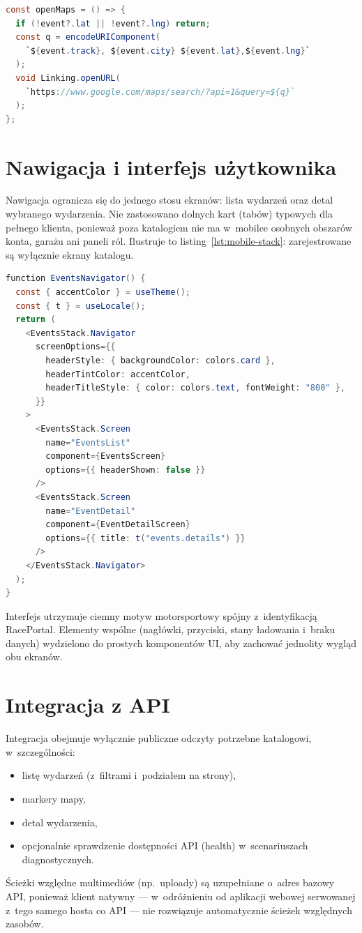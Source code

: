 \documentclass{sprz}
\begin{document}
\begin{lstlisting}[language=Java,caption={Otwarcie lokalizacji wydarzenia w~zewnętrznej aplikacji map},label={lst:mobile-maps}]
const openMaps = () => {
  if (!event?.lat || !event?.lng) return;
  const q = encodeURIComponent(
    `${event.track}, ${event.city} ${event.lat},${event.lng}`
  );
  void Linking.openURL(
    `https://www.google.com/maps/search/?api=1&query=${q}`
  );
};
\end{lstlisting}

\section{Nawigacja i interfejs użytkownika}
Nawigacja ogranicza się do jednego stosu ekranów: lista wydarzeń oraz detal wybranego wydarzenia. Nie zastosowano dolnych kart (tabów) typowych dla pełnego klienta, ponieważ poza katalogiem nie ma w~mobilce osobnych obszarów konta, garażu ani paneli ról. Ilustruje to listing~\ref{lst:mobile-stack}: zarejestrowane są wyłącznie ekrany katalogu.

\begin{lstlisting}[language=Java,caption={Stos nawigacji ograniczony do listy i~detalu wydarzenia},label={lst:mobile-stack}]
function EventsNavigator() {
  const { accentColor } = useTheme();
  const { t } = useLocale();
  return (
    <EventsStack.Navigator
      screenOptions={{
        headerStyle: { backgroundColor: colors.card },
        headerTintColor: accentColor,
        headerTitleStyle: { color: colors.text, fontWeight: "800" },
      }}
    >
      <EventsStack.Screen
        name="EventsList"
        component={EventsScreen}
        options={{ headerShown: false }}
      />
      <EventsStack.Screen
        name="EventDetail"
        component={EventDetailScreen}
        options={{ title: t("events.details") }}
      />
    </EventsStack.Navigator>
  );
}
\end{lstlisting}

Interfejs utrzymuje ciemny motyw motorsportowy spójny z~identyfikacją RacePortal. Elementy wspólne (nagłówki, przyciski, stany ładowania i~braku danych) wydzielono do prostych komponentów UI, aby zachować jednolity wygląd obu ekranów.

\section{Integracja z API}
Integracja obejmuje wyłącznie publiczne odczyty potrzebne katalogowi, w~szczególności:
\begin{itemize}
  \item listę wydarzeń (z~filtrami i~podziałem na strony),
  \item markery mapy,
  \item detal wydarzenia,
  \item opcjonalnie sprawdzenie dostępności API (health) w~scenariuszach diagnostycznych.
\end{itemize}
Ścieżki względne multimediów (np.\ uploady) są uzupełniane o~adres bazowy API, ponieważ klient natywny --- w~odróżnieniu od aplikacji webowej serwowanej z~tego samego hosta co API --- nie rozwiązuje automatycznie ścieżek względnych zasobów.
\end{document}
